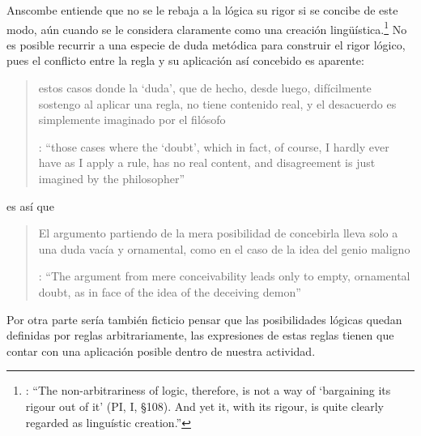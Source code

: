 Anscombe entiende que no se le rebaja a la lógica su rigor si se concibe de este modo, aún cuando se le considera claramente como una creación lingüística.\footnote{\cite[Cf.~][124]{anscombe1981parmenides:qli}: \enquote{The non-arbitrariness of logic, therefore, is not a way of `bargaining its rigour out of it' (PI, I, \S108). And yet it, with its rigour, is quite clearly regarded as linguístic creation.}} No es posible recurrir a una especie de duda metódica para construir el rigor lógico, pues el conflicto entre la regla y su aplicación así concebido es aparente: \blockquote[{\cite[Cf.~][124]{anscombe1981parmenides:qli}}: \enquote{those  cases where the `doubt', which in fact, of course, I hardly ever have as I apply a rule, has no real content, and disagreement is just imagined by the philosopher}]{estos  casos donde la `duda', que de hecho, desde luego, difícilmente sostengo al aplicar una regla, no tiene contenido real, y el desacuerdo es simplemente imaginado por el filósofo} es así que \blockquote[{\cite[Cf.~][124]{anscombe1981parmenides:qli}}: \enquote{The argument from mere conceivability leads only to empty, ornamental doubt, as in face of the idea of the deceiving demon}]{El argumento partiendo de la mera posibilidad de concebirla lleva solo a una duda vacía y ornamental, como en el caso de la idea del genio maligno}. Por otra parte sería también ficticio pensar que las posibilidades lógicas quedan definidas por reglas arbitrariamente, las expresiones de estas reglas tienen que contar con una aplicación posible dentro de nuestra actividad. %